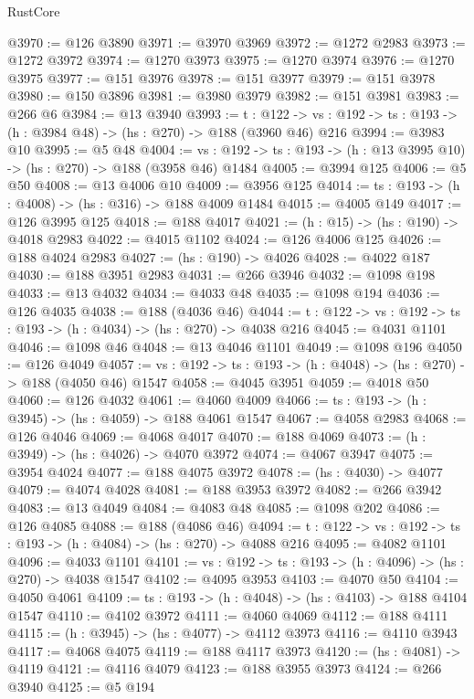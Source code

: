 \begin{lexlean}{RustCore}
\begin{coremodule}
@3970 := @126 @3890
@3971 := @3970 @3969
@3972 := @1272 @2983
@3973 := @1272 @3972
@3974 := @1270 @3973
@3975 := @1270 @3974
@3976 := @1270 @3975
@3977 := @151 @3976
@3978 := @151 @3977
@3979 := @151 @3978
@3980 := @150 @3896
@3981 := @3980 @3979
@3982 := @151 @3981
@3983 := @266 @6
@3984 := @13 @3940
@3993 := {t : @122} ->
  {vs : @192} -> {ts : @193} -> (h : @3984 @48) -> (hs : @270) -> @188 (@3960 @46) @216
@3994 := @3983 @10
@3995 := @5 @48
@4004 := {vs : @192} -> {ts : @193} -> (h : @13 @3995 @10) -> (hs : @270) -> @188 (@3958 @46) @1484
@4005 := @3994 @125
@4006 := @5 @50
@4008 := @13 @4006 @10
@4009 := @3956 @125
@4014 := {ts : @193} -> (h : @4008) -> (hs : @316) -> @188 @4009 @1484
@4015 := @4005 @149
@4017 := @126 @3995 @125
@4018 := @188 @4017
@4021 := (h : @15) -> (hs : @190) -> @4018 @2983
@4022 := @4015 @1102
@4024 := @126 @4006 @125
@4026 := @188 @4024 @2983
@4027 := (hs : @190) -> @4026
@4028 := @4022 @187
@4030 := @188 @3951 @2983
@4031 := @266 @3946
@4032 := @1098 @198
@4033 := @13 @4032
@4034 := @4033 @48
@4035 := @1098 @194
@4036 := @126 @4035
@4038 := @188 (@4036 @46)
@4044 := {t : @122} -> {vs : @192} -> {ts : @193} -> (h : @4034) -> (hs : @270) -> @4038 @216
@4045 := @4031 @1101
@4046 := @1098 @46
@4048 := @13 @4046 @1101
@4049 := @1098 @196
@4050 := @126 @4049
@4057 := {vs : @192} -> {ts : @193} -> (h : @4048) -> (hs : @270) -> @188 (@4050 @46) @1547
@4058 := @4045 @3951
@4059 := @4018 @50
@4060 := @126 @4032
@4061 := @4060 @4009
@4066 := {ts : @193} -> (h : @3945) -> (hs : @4059) -> @188 @4061 @1547
@4067 := @4058 @2983
@4068 := @126 @4046
@4069 := @4068 @4017
@4070 := @188 @4069
@4073 := (h : @3949) -> (hs : @4026) -> @4070 @3972
@4074 := @4067 @3947
@4075 := @3954 @4024
@4077 := @188 @4075 @3972
@4078 := (hs : @4030) -> @4077
@4079 := @4074 @4028
@4081 := @188 @3953 @3972
@4082 := @266 @3942
@4083 := @13 @4049
@4084 := @4083 @48
@4085 := @1098 @202
@4086 := @126 @4085
@4088 := @188 (@4086 @46)
@4094 := {t : @122} -> {vs : @192} -> {ts : @193} -> (h : @4084) -> (hs : @270) -> @4088 @216
@4095 := @4082 @1101
@4096 := @4033 @1101
@4101 := {vs : @192} -> {ts : @193} -> (h : @4096) -> (hs : @270) -> @4038 @1547
@4102 := @4095 @3953
@4103 := @4070 @50
@4104 := @4050 @4061
@4109 := {ts : @193} -> (h : @4048) -> (hs : @4103) -> @188 @4104 @1547
@4110 := @4102 @3972
@4111 := @4060 @4069
@4112 := @188 @4111
@4115 := (h : @3945) -> (hs : @4077) -> @4112 @3973
@4116 := @4110 @3943
@4117 := @4068 @4075
@4119 := @188 @4117 @3973
@4120 := (hs : @4081) -> @4119
@4121 := @4116 @4079
@4123 := @188 @3955 @3973
@4124 := @266 @3940
@4125 := @5 @194

\end{coremodule}
\end{lexlean}
